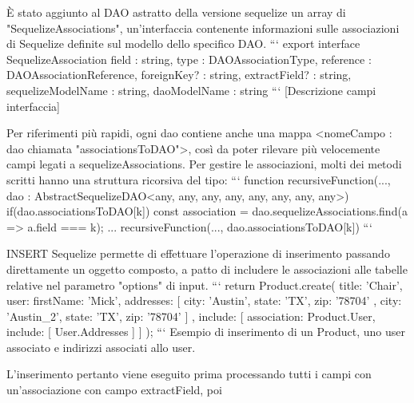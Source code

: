         È stato aggiunto al DAO astratto della versione sequelize un array di "SequelizeAssociations", un'interfaccia contenente informazioni sulle associazioni di Sequelize definite sul modello dello specifico DAO.
        ```
        export interface SequelizeAssociation {
            field : string,
            type : DAOAssociationType,
            reference : DAOAssociationReference,
            foreignKey? : string,
            extractField? : string,
            sequelizeModelName : string,
            daoModelName : string
        }
        ```
        [Descrizione campi interfaccia]

        Per riferimenti più rapidi, ogni dao contiene anche una mappa <nomeCampo : dao chiamata "associationsToDAO">, così da poter rilevare più velocemente campi legati a sequelizeAssociations.
        Per gestire le associazioni, molti dei metodi scritti hanno una struttura ricorsiva del tipo:
        ```
        function recursiveFunction(..., dao : AbstractSequelizeDAO<any, any, any, any, any, any, any, any>) {
            if(dao.associationsToDAO[k]) {
                const association = dao.sequelizeAssociations.find(a => a.field === k);
                ...
                recursiveFunction(..., dao.associationsToDAO[k])
            }
        }
        ```

        INSERT
            Sequelize permette di effettuare l'operazione di inserimento passando direttamente un oggetto composto, a patto di includere le associazioni alle tabelle relative
            nel parametro "options" di input.
            ```
            return Product.create({
                title: 'Chair',
                user: {
                    firstName: 'Mick',
                    addresses: [{
                        city: 'Austin',
                        state: 'TX',
                        zip: '78704'
                    },{
                        city: 'Austin_2',
                        state: 'TX',
                        zip: '78704'
                    }]
                }
                }, {
                include: [{
                    association: Product.User,
                    include: [ User.Addresses ]
                }]
            });
            ```
            Esempio di inserimento di un Product, uno user associato e indirizzi associati allo user.

            L'inserimento pertanto viene eseguito prima processando tutti i campi con un'associazione con campo extractField, poi 




